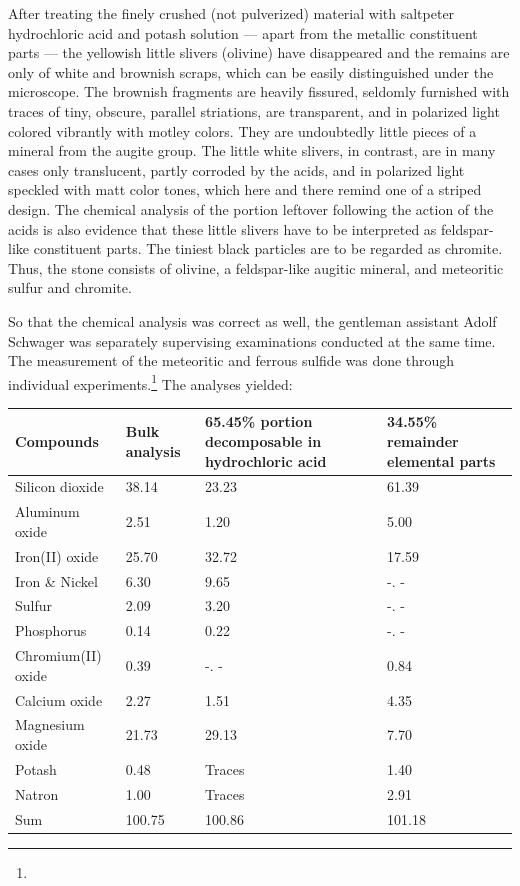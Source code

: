 \documentclass[a4paper, 12pt, oneside]{article}
\begin{document}
After treating the finely crushed (not pulverized) material with saltpeter hydrochloric acid and potash solution --- apart from the metallic constituent parts --- the yellowish little slivers (olivine) have disappeared and the remains are only of white and brownish scraps, which can be easily distinguished under the microscope. The brownish fragments are heavily fissured, seldomly furnished with traces of tiny, obscure, parallel striations, are transparent, and in polarized light colored vibrantly with motley colors. They are undoubtedly little pieces of a mineral from the augite group. The little white slivers, in contrast, are in many cases only translucent, partly corroded by the acids, and in polarized light speckled with matt color tones, which here and there remind one of a striped design. The chemical analysis of the portion leftover following the action of the acids is also evidence that these little slivers have to be interpreted as feldspar-like constituent parts. The tiniest black particles are to be regarded as chromite. Thus, the stone consists of olivine, a feldspar-like augitic mineral, and meteoritic sulfur and chromite.

So that the chemical analysis was correct as well, the gentleman assistant Adolf Schwager was separately supervising examinations conducted at the same time. The measurement of the meteoritic and ferrous sulfide was done through individual experiments.\footnote{} The analyses yielded:
\begin{center}
    \begin{tabular}{ |l|p{1.5cm}|p{3.2cm}|p{2.9cm}| }
    \hline
    Compounds & Bulk analysis & 65.45\% portion decomposable in hydrochloric acid & 34.55\% remainder elemental parts\\\hline
    Silicon dioxide & 38.14 & 23.23 & 61.39\\\hline
    Aluminum oxide & 2.51 & 1.20 & 5.00\\\hline
    Iron(II) oxide & 25.70 & 32.72 & 17.59\\\hline
    Iron \& Nickel & 6.30 & 9.65 & -. -\\\hline
    Sulfur & 2.09 & 3.20 & -. -\\\hline
    Phosphorus & 0.14 & 0.22 & -. -\\\hline
    Chromium(II) oxide & 0.39 & -. - & 0.84\\\hline
    Calcium oxide & 2.27 & 1.51 & 4.35\\\hline
    Magnesium oxide & 21.73 & 29.13 & 7.70\\\hline
    Potash & 0.48 & Traces & 1.40\\\hline
    Natron & 1.00 & Traces & 2.91\\\hline
    Sum & 100.75 & 100.86 & 101.18\\
    \hline
    \end{tabular}
\end{center}
\end{document}
